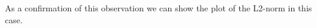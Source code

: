 \documentclass[11pt,a4paper]{article}
\begin{document}
\begin{figure}[!h]
\centering
{}
\end{figure}
\ \\ \\
As a confirmation of this observation we can show the plot of the L2-norm in this case.
\end{document}

